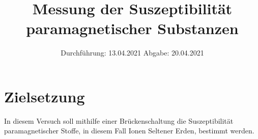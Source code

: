 
\usepackage{parskip}

\subject{V606}
\title{Messung der Suszeptibilität paramagnetischer Substanzen}
\date{
    Durchführung: 13.04.2021
    \hspace{3em}
    Abgabe: 20.04.2021
}



\maketitle
\thispagestyle{empty}
\tableofcontents
\newpage

\section{Zielsetzung}

    In diesem Versuch soll mithilfe einer Brückenschaltung die Suszeptibilität paramagnetischer Stoffe,
    in diesem Fall Ionen Seltener Erden,
    bestimmt werden.


\clearpage


\clearpage


\clearpage


\clearpage

\printbibliography


